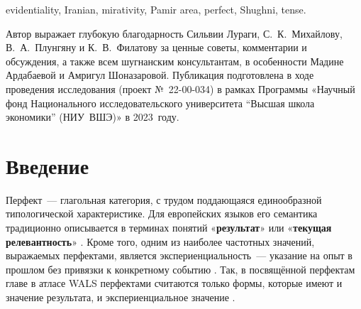 \begin{eng-keywords}
evidentiality, Iranian, mirativity, Pamir area, perfect, Shughni, tense.
\end{eng-keywords}

\begin{acknowledgements}
Автор выражает глубокую благодарность Сильвии Лураги, С.~К.~Михайлову, В.~А.~Плунгяну и К.~В.~Филатову за ценные советы, комментарии и обсуждения, а также всем шугнанским консультантам, в особенности Мадине Ардабаевой и Амригул Шоназаровой. Публикация подготовлена в ходе проведения исследования (проект №~22-00-034) в рамках Программы «Научный фонд Национального исследовательского университета “Высшая школа экономики” (НИУ~ВШЭ)» в 2023~году.
\end{acknowledgements}

\begin{initialprint}
\end{initialprint}

\section{Введение} \label{evid-intro}

Перфект~— глагольная категория, с трудом поддающаяся единообразной типологической характеристике. Для европейских языков его семантика традиционно описывается в терминах понятий «\textbf{результат}» или «\textbf{текущая релевантность}» \parencite[52–65]{comrie1976}. Кроме того, одним из наиболее частотных значений, выражаемых перфектами, является экспериенциальность~— указание на опыт в прошлом без привязки к конкретному событию \parencite[67]{bybee_dahl1989}. Так, в посвящённой перфектам главе в атласе WALS перфектами считаются только формы, которые имеют и значение результата, и экспериенциальное значение \parencite{dahl_velupillai2013}.

